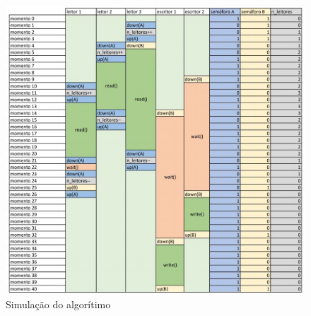 \documentclass[12pt, a4paper]{article}
\begin{document}
\begin{figure}[!htb]
	\centering
	\includegraphics[keepaspectratio, width=\textwidth]{tabela.jpeg}
	\caption{\label{fig:tabela.pdf} Simulação do algorítimo}
\end{figure}
\end{document}
